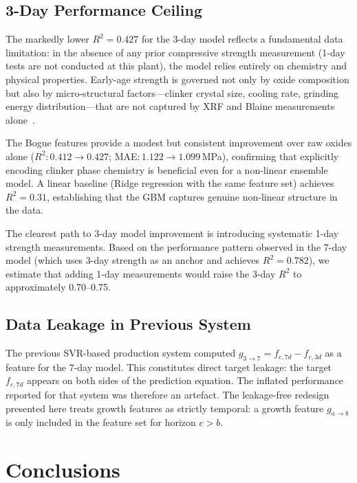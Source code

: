 \documentclass[preprint,12pt]{elsarticle}
\begin{document}
\subsection{3-Day Performance Ceiling}
\label{sec:3d}

The markedly lower $R^2 = 0.427$ for the 3-day model reflects a fundamental
data limitation: in the absence of any prior compressive strength measurement
(1-day tests are not conducted at this plant), the model relies entirely on
chemistry and physical properties.
Early-age strength is governed not only by oxide composition but also by
micro-structural factors---clinker crystal size, cooling rate, grinding energy
distribution---that are not captured by XRF and Blaine measurements
alone~\cite{taylor1997}.

The Bogue features provide a modest but consistent improvement over raw oxides
alone ($R^2 \colon 0.412 \to 0.427$; MAE$\colon 1.122 \to 1.099$\,MPa),
confirming that explicitly encoding clinker phase chemistry is beneficial even
for a non-linear ensemble model.
A linear baseline (Ridge regression with the same feature set) achieves
$R^2 = 0.31$, establishing that the GBM captures genuine non-linear
structure in the data.

The clearest path to 3-day model improvement is introducing systematic 1-day
strength measurements.
Based on the performance pattern observed in the 7-day model (which uses
3-day strength as an anchor and achieves $R^2 = 0.782$), we estimate that
adding 1-day measurements would raise the 3-day $R^2$ to approximately
0.70--0.75.

\subsection{Data Leakage in Previous System}
\label{sec:leakage}

The previous SVR-based production system computed
$g_{3\to7} = f_{c,7d} - f_{c,3d}$ as a feature for the 7-day model.
This constitutes direct target leakage: the target $f_{c,7d}$ appears on both
sides of the prediction equation.
The inflated performance reported for that system was therefore an artefact.
The leakage-free redesign presented here treats growth features as strictly
temporal: a growth feature $g_{a\to b}$ is only included in the feature set
for horizon $c > b$.

\section{Conclusions}
\label{sec:conclusions}
\end{document}
